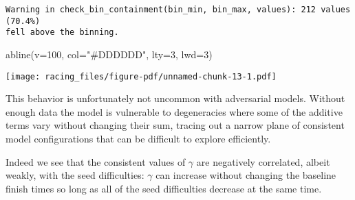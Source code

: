 \documentclass[
  letterpaper,
  DIV=11,
  numbers=noendperiod]{scrartcl}
\newenvironment{Shaded}{\begin{snugshade}}{\end{snugshade}}
\newcommand{\AttributeTok}[1]{\textcolor[rgb]{0.40,0.45,0.13}{#1}}
\newcommand{\DecValTok}[1]{\textcolor[rgb]{0.68,0.00,0.00}{#1}}
\newcommand{\FunctionTok}[1]{\textcolor[rgb]{0.28,0.35,0.67}{#1}}
\newcommand{\NormalTok}[1]{\textcolor[rgb]{0.00,0.23,0.31}{#1}}
\newcommand{\OtherTok}[1]{\textcolor[rgb]{0.00,0.23,0.31}{#1}}
\newcommand{\SpecialCharTok}[1]{\textcolor[rgb]{0.37,0.37,0.37}{#1}}
\newcommand{\StringTok}[1]{\textcolor[rgb]{0.13,0.47,0.30}{#1}}
\begin{document}
\begin{Shaded}
\end{Shaded}

\begin{verbatim}
Warning in check_bin_containment(bin_min, bin_max, values): 212 values (70.4%)
fell above the binning.
\end{verbatim}

\begin{Shaded}
\begin{Highlighting}[]
\FunctionTok{abline}\NormalTok{(}\AttributeTok{v=}\DecValTok{100}\NormalTok{, }\AttributeTok{col=}\StringTok{"\#DDDDDD"}\NormalTok{, }\AttributeTok{lty=}\DecValTok{3}\NormalTok{, }\AttributeTok{lwd=}\DecValTok{3}\NormalTok{)}
\end{Highlighting}
\end{Shaded}

\texttt{[image: racing\_files/figure-pdf/unnamed-chunk-13-1.pdf]}

This behavior is unfortunately not uncommon with adversarial models.
Without enough data the model is vulnerable to degeneracies where some
of the additive terms vary without changing their sum, tracing out a
narrow plane of consistent model configurations that can be difficult to
explore efficiently.

Indeed we see that the consistent values of \(\gamma\) are negatively
correlated, albeit weakly, with the seed difficulties: \(\gamma\) can
increase without changing the baseline finish times so long as all of
the seed difficulties decrease at the same time.
\end{document}
